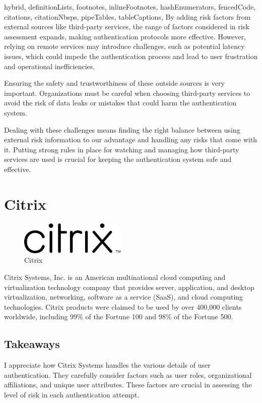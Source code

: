 \documentclass[
  digital,     %
  oneside,     %
  nosansbold,  %
  nocolorbold, %
  lof,         %
  lot,         %
]{fithesis4}
\begin{document}
\begin{markdown*}{%
  hybrid,
  definitionLists,
  footnotes,
  inlineFootnotes,
  hashEnumerators,
  fencedCode,
  citations,
  citationNbsps,
  pipeTables,
  tableCaptions,
}
By adding risk factors from external sources like third-party services, the range of factors considered in risk assessment expands, making authentication protocols more effective.
However, relying on remote services may introduce challenges, such as potential latency issues, which could impede the authentication process and lead to user frustration and operational inefficiencies.

Ensuring the safety and trustworthiness of these outside sources is very important.
Organizations must be careful when choosing third-party services to avoid the risk of data leaks or mistakes that could harm the authentication system.

Dealing with these challenges means finding the right balance between using external risk information to our advantage and handling any risks that come with it.
Putting strong rules in place for watching and managing how third-party services are used is crucial for keeping the authentication system safe and effective. \cite{existing-okta-lowrisk} \cite{existing-okta-confidence}

\newpage
\section{Citrix}

\begin{figure}[htbp]
  \centering
  \includegraphics[width=0.45\textwidth]{img/citrix.png}
  \caption{Citrix}
  \label{fig:citrix-logo}
\end{figure}

Citrix Systems, Inc. is an American multinational cloud computing and virtualization technology company that provides server, application, and desktop virtualization, networking, software as a service (SaaS), and cloud computing technologies.
Citrix products were claimed to be used by over 400,000 clients worldwide, including 99\% of the Fortune 100 and 98\% of the Fortune 500.

\subsection{Takeaways}
I appreciate how Citrix Systems handles the various details of user authentication.
They carefully consider factors such as user roles, organizational affiliations, and unique user attributes.
These factors are crucial in assessing the level of risk in each authentication attempt.


\end{markdown*}
\end{document}
